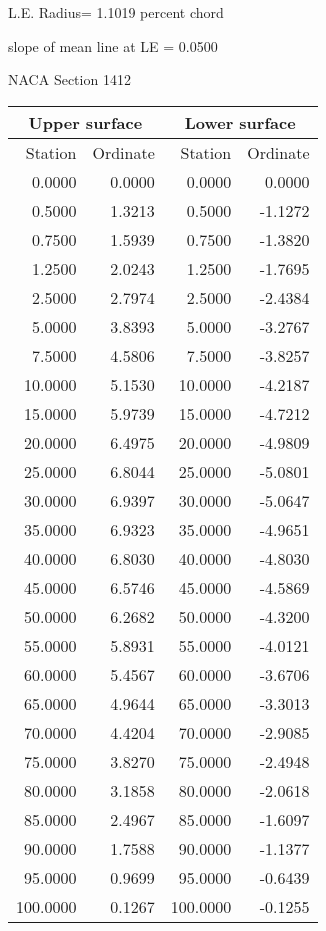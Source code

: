 \documentclass[11pt]{book}
\begin{document}
L.E. Radius=  1.1019 percent chord


 slope of mean line at LE =  0.0500
 \newpage
  \label{s1412}
 \begin{Large}
 NACA Section 1412
 \end{Large}
  
 \vspace{8mm}
 \begin{tabular}{|r|r|r|r|} \hline 
 \multicolumn{2}{|c|}{Upper surface} & \multicolumn{2}{|c|}{Lower surface} \\
 \hline
 Station & Ordinate & Station & Ordinate \\
 \hline
0.0000 & 0.0000 & 0.0000 & 0.0000 \\
0.5000 & 1.3213 & 0.5000 & -1.1272 \\
0.7500 & 1.5939 & 0.7500 & -1.3820 \\
1.2500 & 2.0243 & 1.2500 & -1.7695 \\
2.5000 & 2.7974 & 2.5000 & -2.4384 \\
5.0000 & 3.8393 & 5.0000 & -3.2767 \\
7.5000 & 4.5806 & 7.5000 & -3.8257 \\
10.0000 & 5.1530 & 10.0000 & -4.2187 \\
15.0000 & 5.9739 & 15.0000 & -4.7212 \\
20.0000 & 6.4975 & 20.0000 & -4.9809 \\
25.0000 & 6.8044 & 25.0000 & -5.0801 \\
30.0000 & 6.9397 & 30.0000 & -5.0647 \\
35.0000 & 6.9323 & 35.0000 & -4.9651 \\
40.0000 & 6.8030 & 40.0000 & -4.8030 \\
45.0000 & 6.5746 & 45.0000 & -4.5869 \\
50.0000 & 6.2682 & 50.0000 & -4.3200 \\
55.0000 & 5.8931 & 55.0000 & -4.0121 \\
60.0000 & 5.4567 & 60.0000 & -3.6706 \\
65.0000 & 4.9644 & 65.0000 & -3.3013 \\
70.0000 & 4.4204 & 70.0000 & -2.9085 \\
75.0000 & 3.8270 & 75.0000 & -2.4948 \\
80.0000 & 3.1858 & 80.0000 & -2.0618 \\
85.0000 & 2.4967 & 85.0000 & -1.6097 \\
90.0000 & 1.7588 & 90.0000 & -1.1377 \\
95.0000 & 0.9699 & 95.0000 & -0.6439 \\
100.0000 & 0.1267 & 100.0000 & -0.1255 \\
 \hline 
 \end{tabular}
\end{document}
